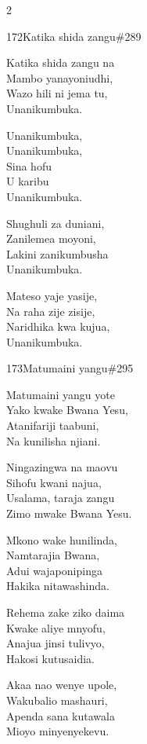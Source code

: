 \begin{multicols}{2}
\begin{hymn}{172}{Katika shida zangu}{\#289}
\begin{stanza}
Katika shida zangu na\\
Mambo yanayoniudhi,\\
Wazo hili ni jema tu,\\
Unanikumbuka.
\end{stanza}
\begin{chorus}
Unanikumbuka,\\
Unanikumbuka,\\
Sina hofu\\
U karibu\\
Unanikumbuka.
\end{chorus}
\begin{stanza}
Shughuli za duniani,\\
Zanilemea moyoni,\\
Lakini zanikumbusha\\
Unanikumbuka.
\end{stanza}
\begin{stanza}
Mateso yaje yasije,\\
Na raha zije zisije,\\
Naridhika kwa kujua,\\
Unanikumbuka.
\end{stanza}
\end{hymn}

\begin{hymn}{173}{Matumaini yangu}{\#295}
\begin{stanza}
Matumaini yangu yote\\
Yako kwake Bwana Yesu,\\
Atanifariji taabuni,\\
Na kunilisha njiani.
\end{stanza}
\begin{chorus}
Ningazingwa na maovu\\
Sihofu kwani najua,\\
Usalama, taraja zangu\\
Zimo mwake Bwana Yesu.
\end{chorus}
\begin{stanza}
Mkono wake hunilinda,\\
Namtarajia Bwana,\\
Adui wajaponipinga\\
Hakika nitawashinda.
\end{stanza}
\begin{stanza}
Rehema zake ziko daima\\
Kwake aliye mnyofu,\\
Anajua jinsi tulivyo,\\
Hakosi kutusaidia.
\end{stanza}
\begin{stanza}
Akaa nao wenye upole,\\
Wakubalio mashauri,\\
Apenda sana kutawala\\
Mioyo minyenyekevu.
\end{stanza}
\end{hymn}


\end{multicols}

